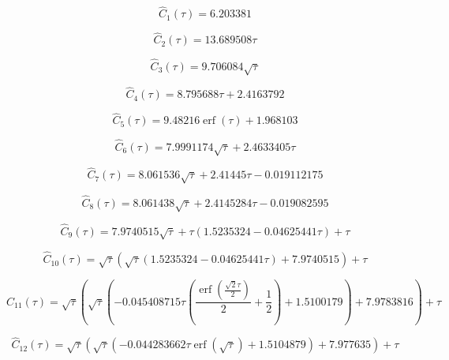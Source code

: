 \documentclass[12pt,twoside,final]{article}
\begin{document}
\begin{equation}
\widehat C_{1}(\tau) = 6.203381
\end{equation}

\begin{equation}
\widehat C_{2}(\tau) = 13.689508\tau
\end{equation}

\begin{equation}
\widehat C_{3}(\tau) = 9.706084 \sqrt{\tau}
\end{equation}

\begin{equation}
\widehat C_{4}(\tau) = 8.795688\tau + 2.4163792
\end{equation}

\begin{equation}
\widehat C_{5}(\tau) = 9.48216 \operatorname{erf}{\left(\tau \right)} + 1.968103
\end{equation}

\begin{equation}
\widehat C_{6}(\tau) = 7.9991174 \sqrt{\tau} + 2.4633405 \tau
\end{equation}

\begin{equation}
\widehat C_{7}(\tau) = 8.061536 \sqrt{\tau} + 2.41445 \tau - 0.019112175
\end{equation}

\begin{equation}
\widehat C_{8}(\tau) = 8.061438 \sqrt{\tau} + 2.4145284 \tau - 0.019082595
\end{equation}

\begin{equation}
\widehat C_{9}(\tau) = 7.9740515 \sqrt{\tau} + \tau \left(1.5235324 - 0.04625441 \tau\right) + \tau
\end{equation}

\begin{equation}
\widehat C_{10}(\tau) = \sqrt{\tau} \left(\sqrt{\tau} \left(1.5235324 - 0.04625441 \tau\right) + 7.9740515\right) + \tau
\end{equation}

\begin{equation}
\widehat C_{11}(\tau) = \sqrt{\tau} \left(\sqrt{\tau} \left(- 0.045408715 \tau \left(\frac{\operatorname{erf}{\left(\frac{\sqrt{2} \tau}{2} \right)}}{2} + \frac{1}{2}\right) + 1.5100179\right) + 7.9783816\right) + \tau
\end{equation}

\begin{equation}
\widehat C_{12}(\tau) = \sqrt{\tau} \left(\sqrt{\tau} \left(- 0.044283662 \tau \operatorname{erf}{\left(\sqrt{\tau} \right)} + 1.5104879\right) + 7.977635\right) + \tau
\end{equation}
\end{document}
